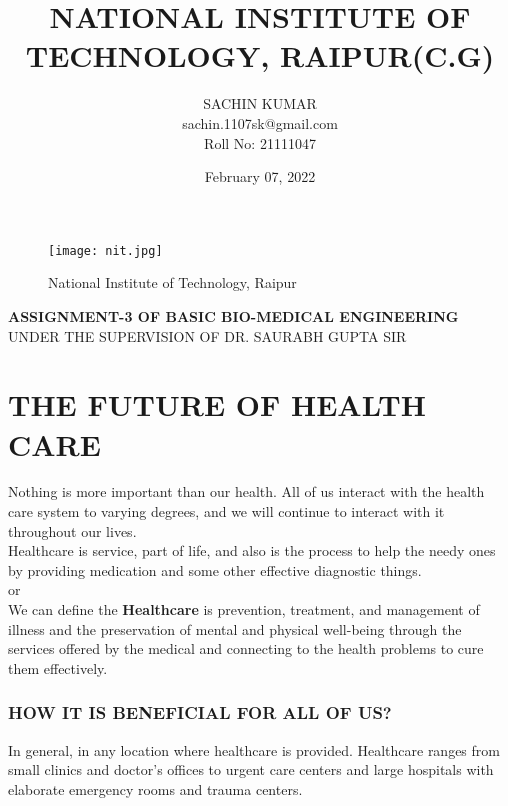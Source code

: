 \documentclass[12pts]{article}
\title{\textbf{NATIONAL INSTITUTE OF TECHNOLOGY, RAIPUR(C.G)}}
\author{SACHIN KUMAR\\sachin.1107sk@gmail.com\\Roll No: 21111047}
\date{February 07, 2022}
\begin{document}
\maketitle

\begin{figure}[h]
\centering
\texttt{[image: nit.jpg]}
\caption{National Institute of Technology, Raipur}
\end{figure}

\textbf{ASSIGNMENT-3 OF BASIC BIO-MEDICAL ENGINEERING}\\
\centering
UNDER THE SUPERVISION OF DR. SAURABH GUPTA SIR\\

\clearpage

\section*{THE FUTURE OF HEALTH CARE}
Nothing is more important than our health. All of us interact with the health care system to varying degrees, and we will continue to interact with it throughout our lives.\\

Healthcare is service, part of life, and also is the process to help the needy ones by providing medication and some other effective diagnostic things.\\ or\\
We can define the \textbf{Healthcare} is prevention, treatment, and management of illness and the preservation of mental and physical well-being through the services offered by the medical and connecting to the health problems to cure them effectively.\\
\subsubsection*{HOW IT IS BENEFICIAL FOR ALL OF US?}

In general, in any location where healthcare is provided. Healthcare ranges from small clinics and doctor's offices to urgent care centers and large hospitals with elaborate emergency rooms and trauma centers.\\
\end{document}
